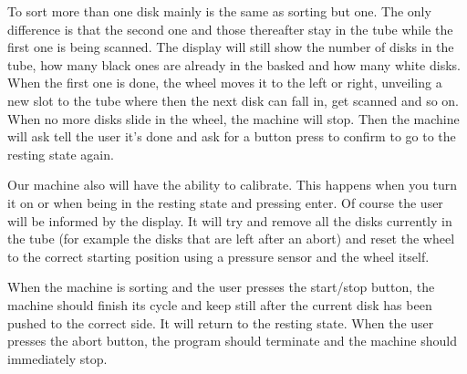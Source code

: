 To sort more than one disk mainly is the same as sorting but one. The only difference is that the second one and those thereafter stay in the tube while the first one is being scanned. The display will still show the number of disks in the tube, how many black ones are already in the basked and how many white disks. When the first one is done, the wheel moves it to the left or right, unveiling a new slot to the tube where then the next disk can fall in, get scanned and so on. When no more disks slide in the wheel, the machine will stop. Then the machine will ask tell the user it's done and ask for a button press to confirm to go to the resting state again.

Our machine also will have the ability to calibrate. This happens when you turn it on or when being in the resting state and pressing enter. Of course the user will be informed by the display. It will try and remove all the disks currently in the tube (for example the disks that are left after an abort) and reset the wheel to the correct starting position using a pressure sensor and the wheel itself.

When the machine is sorting and the user presses the start/stop button, the machine should finish its cycle and keep still after the current disk has been pushed to the correct side. It will return to the resting state. When the user presses the abort button, the program should terminate and the machine should immediately stop.

